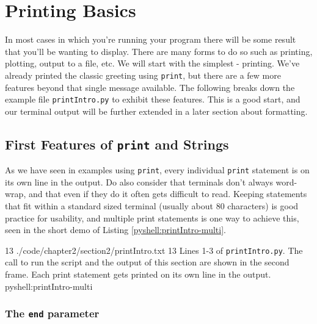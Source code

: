 \documentclass[oneside]{book}
\begin{document}
\FloatBarrier

\section{Printing Basics}\label{sec:printBasics}

In most cases in which you're running your program there will be some result that you'll be wanting to display. There are many forms to do so such as printing, plotting, output to a file, etc. We will start with the simplest - printing. We've already printed the classic greeting using \texttt{print}, but there are a few more features beyond that single message available. The following breaks down the example file \texttt{printIntro.py} to exhibit these features. This is a good start, and our terminal output will be further extended in a later section about formatting.

\FloatBarrier

\subsection{First Features of \texttt{print} and Strings}\label{sec:printFeatures}

As we have seen in examples using \texttt{print}, every individual \texttt{print} statement is on its own line in the output. Do also consider that terminals don't always word-wrap, and that even if they do it often gets difficult to read. Keeping statements that fit within a standard sized terminal (usually about 80 characters) is good practice for usability, and multiple print statements is one way to achieve this, seen in the short demo of Listing \ref{pyshell:printIntro-multi}.

{1}{3}
{./code/chapter2/section2/printIntro.txt}
{1}{3}
{Lines 1-3 of \texttt{printIntro.py}. The call to run the script and the output of this section are shown in the second frame. Each print statement gets printed on its own line in the output.}
{pyshell:printIntro-multi}

\subsubsection{The \texttt{end} parameter}\label{sec:printEnd}
\end{document}
